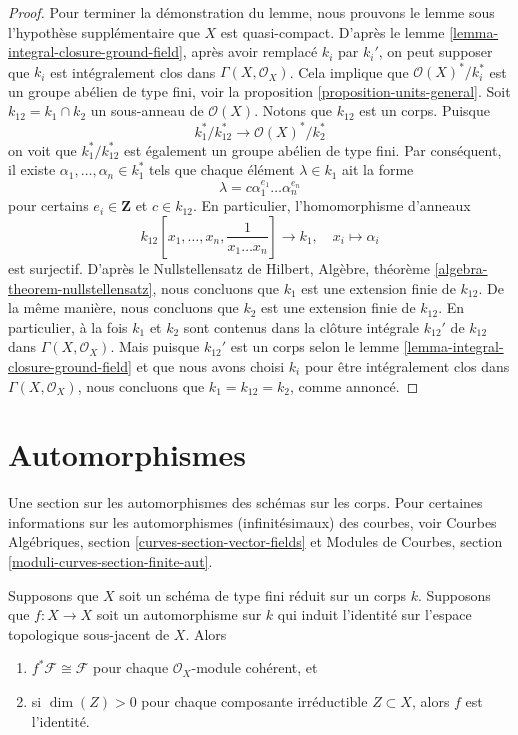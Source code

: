 \begin{proof}
\medskip\noindent
Pour terminer la démonstration du lemme, nous prouvons
le lemme sous l’hypothèse supplémentaire que $X$ est
quasi-compact. D’après le lemme
\ref{lemma-integral-closure-ground-field}, après avoir
remplacé $k_i$ par $k_i'$, on peut supposer que $k_i$
est intégralement clos dans $\Gamma(X, \mathcal{O}_X)$.
Cela implique que $\mathcal{O}(X)^*/k_i^*$ est un groupe
abélien de type fini, voir la proposition
\ref{proposition-units-general}. Soit $k_{12} = k_1 \cap k_2$ un
sous-anneau de $\mathcal{O}(X)$. Notons que $k_{12}$ est un corps. Puisque
$$
k_1^*/k_{12}^* \longrightarrow \mathcal{O}(X)^*/k_2^*
$$
on voit que $k_1^*/k_{12}^*$ est également un groupe abélien
de type fini. Par conséquent, il existe $\alpha_1, \ldots,
\alpha_n \in k_1^*$ tels que chaque élément $\lambda \in k_1$ ait la forme
$$
\lambda = c \alpha_1^{e_1} \ldots \alpha_n^{e_n}
$$
pour certains $e_i \in \mathbf{Z}$ et $c \in
k_{12}$. En particulier, l'homomorphisme d'anneaux
$$
k_{12}[x_1, \ldots, x_n, \frac{1}{x_1 \ldots x_n}] \longrightarrow k_1, \quad
x_i \longmapsto \alpha_i
$$
est surjectif. D'après le Nullstellensatz de Hilbert, Algèbre,
théorème \ref{algebra-theorem-nullstellensatz}, nous concluons
que $k_1$ est une extension finie de $k_{12}$. De la même
manière, nous concluons que $k_2$ est une extension finie de
$k_{12}$. En particulier, à la fois $k_1$ et $k_2$ sont contenus
dans la clôture intégrale $k_{12}'$ de $k_{12}$ dans $\Gamma(X,
\mathcal{O}_X)$. Mais puisque $k_{12}'$ est un corps selon le
lemme \ref{lemma-integral-closure-ground-field} et que nous avons
choisi $k_i$ pour être intégralement clos dans $\Gamma(X,
\mathcal{O}_X)$, nous concluons que $k_1 = k_{12} = k_2$, comme annoncé.
\end{proof}





\section{Automorphismes}
\label{section-automorphisms}

\noindent
Une section sur les automorphismes des schémas sur les
corps. Pour certaines informations sur les automorphismes
(infinitésimaux) des courbes, voir Courbes Algébriques,
section \ref{curves-section-vector-fields} et Modules de
Courbes, section \ref{moduli-curves-section-finite-aut}.

\begin{lemma}
\label{lemma-automorphism}
Supposons que $X$ soit un schéma de type fini réduit sur un corps $k$.
Supposons que $f : X \to X$ soit un automorphisme sur $k$ qui induit
l'identité sur l'espace topologique sous-jacent de $X$. Alors
\begin{enumerate}
\item $f^*\mathcal{F} \cong \mathcal{F}$ pour
chaque $\mathcal{O}_X$-module cohérent, et
\item si $\dim(Z) > 0$ pour chaque composante
irréductible $Z \subset X$, alors $f$ est l'identité.
\end{enumerate}
\end{lemma}

